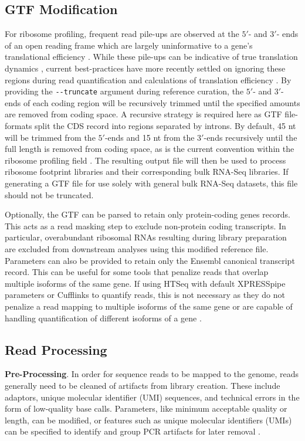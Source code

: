 \documentclass[10pt, oneside]{article}
\begin{document}
\subsection*{GTF Modification}
For ribosome profiling, frequent read pile-ups are observed at the $5'$- and $3'$- ends of an open reading frame which are largely uninformative to a gene's translational efficiency \cite{gerashchenko_nar}. While these pile-ups can be indicative of true translation dynamics \cite{tuller_alt}, current best-practices have more recently settled on ignoring these regions during read quantification and calculations of translation efficiency \cite{ingolia_meth, weinberg_reports}. By providing the \texttt{-{}-truncate} argument during reference curation, the $5'$- and $3'$- ends of each coding region will be recursively trimmed until the specified amounts are removed from coding space. A recursive strategy is required here as GTF file-formats split the CDS record into regions separated by introns. By default, 45 nt will be trimmed from the $5'$-ends and 15 nt from the $3'$-ends recursively until the full length is removed from coding space, as is the current convention within the ribosome profiling field \cite{ingolia_meth}. The resulting output file will then be used to process ribosome footprint libraries and their corresponding bulk RNA-Seq libraries. If generating a GTF file for use solely with general bulk RNA-Seq datasets, this file should not be truncated.\par

Optionally, the GTF can be parsed to retain only protein-coding genes records. This acts as a read masking step to exclude non-protein coding transcripts. In particular, overabundant ribosomal RNAs resulting during library preparation are excluded from downstream analyses using this modified reference file. Parameters can also be provided to retain only the Ensembl canonical transcript record. This can be useful for some tools that penalize reads that overlap multiple isoforms of the same gene. If using HTSeq with default XPRESSpipe parameters or Cufflinks to quantify reads, this is not necessary as they do not penalize a read mapping to multiple isoforms of the same gene or are capable of handling quantification of different isoforms of a gene \cite{htseq, cufflinks}.\\

\subsection*{Read Processing}
\textbf{Pre-Processing}. In order for sequence reads to be mapped to the genome, reads generally need to be cleaned of artifacts from library creation. These include adaptors, unique molecular identifier (UMI) sequences, and technical errors in the form of low-quality base calls. Parameters, like minimum acceptable quality or length, can be modified, or features such as unique molecular identifiers (UMIs) can be specified to identify and group PCR artifacts for later removal \cite{umi, umitools}.\par
\end{document}
